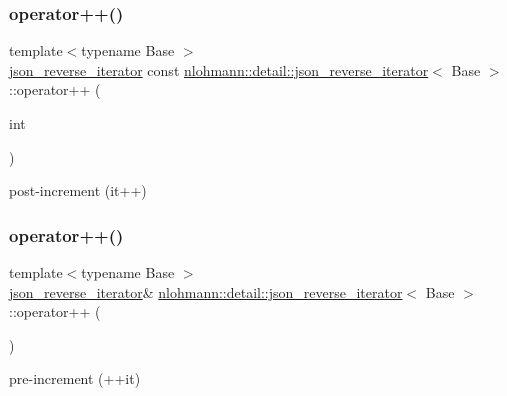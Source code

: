 \subsubsection{\texorpdfstring{operator++()}{operator++()}\hspace{0.1cm}{\footnotesize\ttfamily [1/2]}}
{\footnotesize\ttfamily template$<$typename Base $>$ \\
\hyperlink{classnlohmann_1_1detail_1_1json__reverse__iterator}{json\+\_\+reverse\+\_\+iterator} const \hyperlink{classnlohmann_1_1detail_1_1json__reverse__iterator}{nlohmann\+::detail\+::json\+\_\+reverse\+\_\+iterator}$<$ Base $>$\+::operator++ (\begin{DoxyParamCaption}\item[{int}]{ }\end{DoxyParamCaption})\hspace{0.3cm}{\ttfamily [inline]}}



post-\/increment (it++) 

\mbox{\label{classnlohmann_1_1detail_1_1json__reverse__iterator_a26caf0069a50ce4ecb010a1453e883fc}} 
\subsubsection{\texorpdfstring{operator++()}{operator++()}\hspace{0.1cm}{\footnotesize\ttfamily [2/2]}}
{\footnotesize\ttfamily template$<$typename Base $>$ \\
\hyperlink{classnlohmann_1_1detail_1_1json__reverse__iterator}{json\+\_\+reverse\+\_\+iterator}\& \hyperlink{classnlohmann_1_1detail_1_1json__reverse__iterator}{nlohmann\+::detail\+::json\+\_\+reverse\+\_\+iterator}$<$ Base $>$\+::operator++ (\begin{DoxyParamCaption}{ }\end{DoxyParamCaption})\hspace{0.3cm}{\ttfamily [inline]}}



pre-\/increment (++it) 

\mbox{\label{classnlohmann_1_1detail_1_1json__reverse__iterator_a4e5d0a3bee433104ef87366e00536e01}} 
